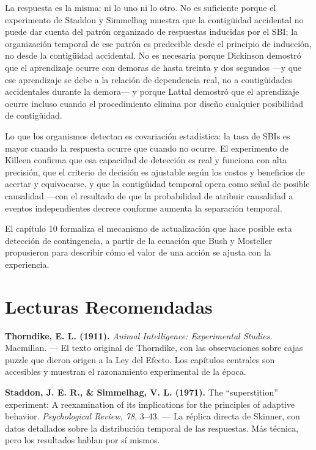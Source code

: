 \documentclass[
  letterpaper,
  DIV=11,
  numbers=noendperiod]{scrreprt}
\begin{document}
\begin{tcolorbox}[enhanced jigsaw, arc=.35mm, bottomrule=.15mm, breakable, colback=white, colframe=quarto-callout-note-color-frame, left=2mm, leftrule=.75mm, opacityback=0, rightrule=.15mm, toprule=.15mm]
La respuesta es la misma: ni lo uno ni lo otro. No es suficiente porque
el experimento de Staddon y Simmelhag muestra que la contigüidad
accidental no puede dar cuenta del patrón organizado de respuestas
inducidas por el SBI; la organización temporal de ese patrón es
predecible desde el principio de inducción, no desde la contigüidad
accidental. No es necesaria porque Dickinson demostró que el aprendizaje
ocurre con demoras de hasta treinta y dos segundos ---y que ese
aprendizaje se debe a la relación de dependencia real, no a
contigüidades accidentales durante la demora--- y porque Lattal demostró
que el aprendizaje ocurre incluso cuando el procedimiento elimina por
diseño cualquier posibilidad de contigüidad.

Lo que los organismos detectan es covariación estadística: la tasa de
SBIs es mayor cuando la respuesta ocurre que cuando no ocurre. El
experimento de Killeen confirma que esa capacidad de detección es real y
funciona con alta precisión, que el criterio de decisión es ajustable
según los costos y beneficios de acertar y equivocarse, y que la
contigüidad temporal opera como señal de posible causalidad ---con el
resultado de que la probabilidad de atribuir causalidad a eventos
independientes decrece conforme aumenta la separación temporal.

El capítulo 10 formaliza el mecanismo de actualización que hace posible
esta detección de contingencia, a partir de la ecuación que Bush y
Mosteller propusieron para describir cómo el valor de una acción se
ajusta con la experiencia.

\section{Lecturas Recomendadas}\label{lecturas-recomendadas-1}

\textbf{Thorndike, E. L. (1911).} \emph{Animal Intelligence:
Experimental Studies.} Macmillan. --- El texto original de Thorndike,
con las observaciones sobre cajas puzzle que dieron origen a la Ley del
Efecto. Los capítulos centrales son accesibles y muestran el
razonamiento experimental de la época.

\textbf{Staddon, J. E. R., \& Simmelhag, V. L. (1971).} The
``superstition'' experiment: A reexamination of its implications for the
principles of adaptive behavior. \emph{Psychological Review, 78}, 3--43.
--- La réplica directa de Skinner, con datos detallados sobre la
distribución temporal de las respuestas. Más técnica, pero los
resultados hablan por sí mismos.


\end{tcolorbox}
\end{document}
